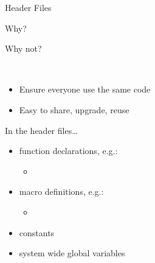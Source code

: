 \begin{frame}{Header Files}
  \begin{minipage}{.45\linewidth}
    \begin{iblock}{Why?}
    \end{iblock}
  \end{minipage}\qquad
  \begin{minipage}{.45\linewidth}
    \begin{iblock}{Why not?}
    \end{iblock}
  \end{minipage}\\[1ex]
  \begin{itemize}
  \item Ensure everyone use the same code
  \item Easy to share, upgrade, reuse
  \end{itemize}
\end{frame}

\begin{frame}
  \begin{iblock}{In the header files\ldots}
    \begin{itemize}
    \item function declarations, e.g.:
      \begin{itemize}
      \item[] 
      \end{itemize}
    \item macro definitions, e.g.:
      \begin{itemize}
      \item[] 
      \end{itemize}
    \item constants
    \item system wide global variables
    \end{itemize}
  \end{iblock}
\end{frame}

